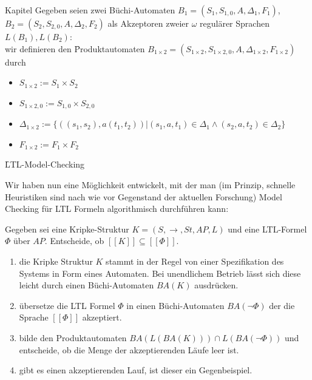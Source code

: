 \begin{chapter}{Kapitel}
\noindent Gegeben seien zwei Büchi-Automaten $B_1=(S_1,S_{1,0},A,\Delta_1,F_1)$, $B_2=(S_2,S_{2,0},A,\Delta_2,F_2)$ als Akzeptoren zweier $\omega$ regulärer
Sprachen $L(B_1),L(B_2)$:  \\ wir definieren den \f{Produktautomaten} $B_{1\times2} =(S_{1\times2},S_{1\times2,0},A,\Delta_{1\times2},F_{1\times2})$ durch 
\begin{itemize}
 \item $S_{1\times2} := S_1\times S_2$
 \item $S_{1\times2,0} := S_{1,0}\times S_{2,0}$
 \item $\Delta_{1\times2} := \{((s_1,s_2),a(t_1,t_2))|(s_1,a,t_1)\in \Delta_1 \wedge (s_2,a,t_2)\in \Delta_2\}$
 \item $F_{1\times2} := F_1\times F_2$
\end{itemize}
\vspace*{6pt}
\f{LTL-Model-Checking}
\vspace*{5pt}

\noindent Wir haben nun eine Möglichkeit entwickelt, mit der man (im Prinzip, schnelle Heuristiken sind nach wie vor Gegenstand der aktuellen Forschung) Model 
Checking für LTL Formeln algorithmisch durchführen kann:

\noindent Gegeben sei eine Kripke-Struktur $K=(S,\rightarrow, St,AP,L)$ und eine LTL-Formel $\Phi$ über $AP$. Entscheide, ob $[[K]] \subseteq [[\Phi]]$.
\begin{enumerate}
 \item die Kripke Struktur $K$ stammt in der Regel von einer Spezifikation des Systems in Form eines Automaten. Bei unendlichem Betrieb lässt sich diese leicht 
 durch einen Büchi-Automaten $BA(K)$ ausdrücken. 
 \item übersetze die LTL Formel $\Phi$ in einen Büchi-Automaten $BA(\neg\Phi)$ der die Sprache $[[\Phi]]$ akzeptiert.
 \item bilde den Produktautomaten $BA(L(BA(K)))\cap L(BA(\neg\Phi))$ und entscheide, ob  die Menge der akzeptierenden Läufe leer ist. 
 \item gibt es einen akzeptierenden Lauf, ist dieser ein Gegenbeispiel.
\end{enumerate}

\end{chapter}
